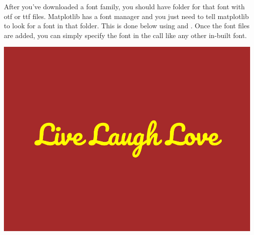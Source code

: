 After you've downloaded a font family, you should have folder for that font with otf or ttf files. Matplotlib has a font manager and you just need to tell matplotlib to look for a font in that folder. This is done below using  and . Once the font files are added, you can simply specify the font in the  call like any other in-built font. 



\begin{center}
    \includegraphics[width = .7\textwidth]{figures/proseplots/font.pdf}
\end{center}
